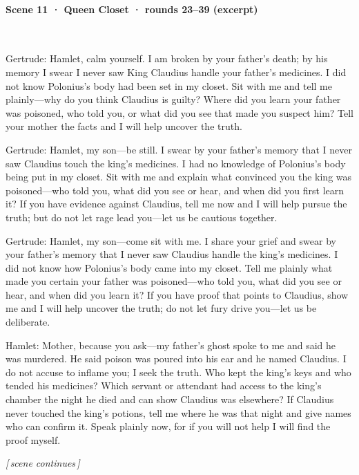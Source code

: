 \paragraph{Scene 11 · Queen Closet · rounds 23–39 (excerpt)}\mbox{}\\[2pt]
\begin{zhblock}\small\setlength{\parskip}{3pt}
Gertrude:
Hamlet, calm yourself.
I am broken by your father's death; by his memory I swear I never saw King Claudius handle your father's medicines.
I did not know Polonius's body had been set in my closet.
Sit with me and tell me plainly—why do you think Claudius is guilty?
Where did you learn your father was poisoned, who told you, or what did you see that made you suspect him? Tell your mother the facts and I will help uncover the truth.
\par Gertrude:
Hamlet, my son—be still.
I swear by your father's memory that I never saw Claudius touch the king's medicines.
I had no knowledge of Polonius's body being put in my closet.
Sit with me and explain what convinced you the king was poisoned—who told you, what did you see or hear, and when did you first learn it?
If you have evidence against Claudius, tell me now and I will help pursue the truth; but do not let rage lead you—let us be cautious together.
\par Gertrude:
Hamlet, my son—come sit with me.
I share your grief and swear by your father's memory that I never saw Claudius handle the king's medicines.
I did not know how Polonius's body came into my closet.
Tell me plainly what made you certain your father was poisoned—who told you, what did you see or hear, and when did you learn it?
If you have proof that points to Claudius, show me and I will help uncover the truth; do not let fury drive you—let us be deliberate.
\par Hamlet:
Mother, because you ask—my father's ghost spoke to me and said he was murdered.
He said poison was poured into his ear and he named Claudius.
I do not accuse to inflame you; I seek the truth.
Who kept the king's keys and who tended his medicines?
Which servant or attendant had access to the king's chamber the night he died and can show Claudius was elsewhere?
If Claudius never touched the king's potions, tell me where he was that night and give names who can confirm it.
Speak plainly now, for if you will not help I will find the proof myself.
\par\textit{[\,scene continues\,]}
\end{zhblock}
